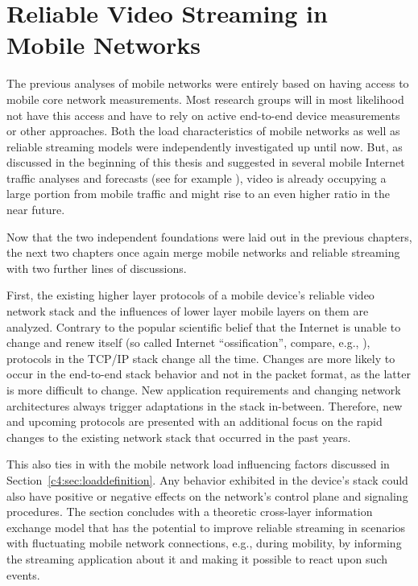 \chapter{Reliable Video Streaming in Mobile Networks}
\label{chap:mobilestreaming}

The previous analyses of mobile networks were entirely based on having access to mobile core network measurements. Most research groups will in most likelihood not have this access and have to rely on active end-to-end device measurements or other approaches. Both the load characteristics of mobile networks as well as reliable streaming models were independently investigated up until now. But, as discussed in the beginning of this thesis and suggested in several mobile Internet traffic analyses and forecasts (see for example \cite{cisco2014VNI}), video is already occupying a large portion from mobile traffic and might rise to an even higher ratio in the near future.

Now that the two independent foundations were laid out in the previous chapters, the next two chapters once again merge mobile networks and reliable streaming with two further lines of discussions. 

First, the existing higher layer protocols of a mobile device's reliable video network stack and the influences of lower layer mobile layers on them are analyzed. Contrary to the popular scientific belief that the Internet is unable to change and renew itself (so called Internet ``ossification'', compare, e.g., \cite{feldmann2010ossification}), protocols in the \gls{TCP}/\gls{IP} stack change all the time. Changes are more likely to occur in the end-to-end stack behavior and not in the packet format, as the latter is more difficult to change. New application requirements and changing network architectures always trigger adaptations in the stack in-between. Therefore, new and upcoming protocols are presented with an additional focus on the rapid changes to the existing network stack that occurred in the past years.

This also ties in with the mobile network load influencing factors discussed in Section~\ref{c4:sec:loaddefinition}. Any behavior exhibited in the device's stack could also have positive or negative effects on the network's control plane and signaling procedures. The section concludes with a theoretic cross-layer information exchange model that has the potential to improve reliable streaming in scenarios with fluctuating mobile network connections, e.g., during mobility, by informing the streaming application about it and making it possible to react upon such events.

